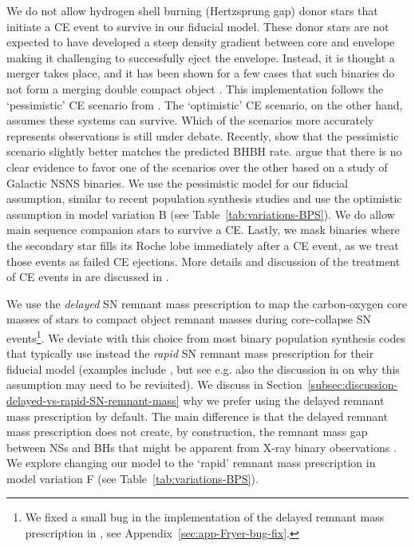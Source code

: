 \documentclass[twocolumn]{aastex63}
\begin{document}
We do not allow hydrogen shell burning (Hertzsprung gap) donor stars  that initiate a \ac{CE} event to survive in our fiducial model. These donor stars are not expected to have developed a steep density gradient between core and envelope  \citep{2000ARA&A..38..113T,2004ApJ...601.1058I}  making it challenging to successfully eject the envelope. Instead, it is thought a merger takes place, and it has been shown for a few cases that such  binaries do not form a merging double compact object \citep{2015MNRAS.449.4415P,2017MNRAS.465.2092P}.  This implementation follows the `pessimistic' \ac{CE} scenario from \citet{2012ApJ...759...52D}.  The `optimistic' \ac{CE} scenario, on the other hand, assumes these systems can survive.   Which of the scenarios more accurately represents observations is still under debate.   Recently, \citet{2017MNRAS.472.2422M} show that the pessimistic scenario slightly better matches the predicted  \ac{BHBH}  rate.   \citet{2018MNRAS.481.4009V}  argue that there is no clear evidence to favor one of the scenarios over the other based on a study of Galactic \ac{NSNS}  binaries.  
We use the pessimistic model for our fiducial assumption, similar to recent  population synthesis studies \citep[e.g.][]{2018MNRAS.480.2011G,2019ApJ...885....1W,2019MNRAS.490.3740N} and use the optimistic assumption in model variation B (see Table~\ref{tab:variations-BPS}). We do allow main sequence companion stars to survive a \ac{CE}. %
Lastly, we mask binaries where the secondary star fills its Roche lobe immediately after a \ac{CE} event, as we treat those events as failed \ac{CE} ejections. 
	More details and discussion of the treatment of \ac{CE} events in {} are discussed in \citet{2020arXiv200109829V}. 



We use the \textit{delayed} \ac{SN}  remnant mass prescription \citep{2012ApJ...749...91F}  to map the carbon-oxygen core masses of stars to compact object remnant masses during core-collapse \ac{SN}  events\footnote{ We fixed a small bug in the implementation of the delayed remnant mass prescription in  {}, see Appendix~\ref{sec:app-Fryer-bug-fix}.}. 
We deviate with this choice from most binary population synthesis codes that typically  use instead the \textit{rapid} \ac{SN}  remnant mass prescription for their fiducial model (examples include \citealt[][]{2018arXiv181200012K, 2019arXiv191100903B},  but see e.g. also the discussion in \citealt{2019arXiv191203599E} on why this assumption may need to be revisited). We discuss in  Section~\ref{subsec:discussion-delayed-vs-rapid-SN-remnant-mass} why we prefer using the delayed remnant mass prescription by default. 
The main difference is that the delayed remnant mass prescription does not create, by construction, the remnant mass gap between NSs and BHs that might be apparent from  X-ray binary observations 
\citep{1998ApJ...499..367B, 2010ApJ...725.1918O, 2011APS..APRH11002F}. 
 We explore changing our model to the `rapid' remnant mass prescription in model variation F (see Table~\ref{tab:variations-BPS}).
\end{document}
